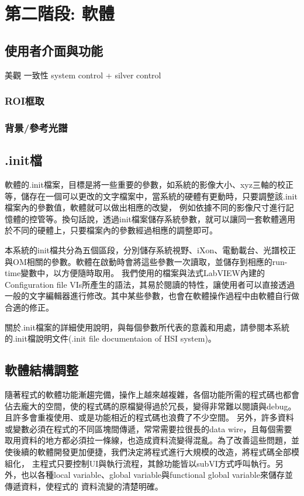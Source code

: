 \documentclass[12pt]{article}
\begin{document}
    \section{第二階段: 軟體}
    \subsection{使用者介面與功能}
    美觀 一致性 system control + silver control
    \subsubsection{ROI框取}
    \subsubsection{背景/參考光譜}
    \subsection{.init檔}
    軟體的.init檔案，目標是將一些重要的參數，如系統的影像大小、xyz三軸的校正等，儲存在一個可以更改的文字檔案中，當系統的硬體有更動時，只要調整該.init檔案內的參數值，軟體就可以做出相應的改變，
    例如依據不同的影像尺寸進行記憶體的控管等。換句話說，透過init檔案儲存系統參數，就可以讓同一套軟體適用於不同的硬體上，只要檔案內的參數經過相應的調整即可。

    本系統的init檔共分為五個區段，分別儲存系統視野、iXon、電動載台、光譜校正與OM相關的參數。軟體在啟動時會將這些參數一次讀取，並儲存到相應的run-time變數中，以方便隨時取用。
    我們使用的檔案與法式LabVIEW內建的Configuration file VIs所產生的語法，其易於閱讀的特性，讓使用者可以直接透過一般的文字編輯器進行修改。其中某些參數，也會在軟體操作過程中由軟體自行做合適的修正。

    關於.init檔案的詳細使用說明，與每個參數所代表的意義和用處，請參閱本系統的.init檔說明文件(.init file documentaion of HSI system)。
    \subsection{軟體結構調整}
    隨著程式的軟體功能漸趨完備，操作上越來越複雜，各個功能所需的程式碼也都會佔去龐大的空間，使的程式碼的原檔變得過於冗長，變得非常難以閱讀與debug。且許多會重複使用、或是功能相近的程式碼也浪費了不少空間。
    另外，許多資料或變數必須在程式的不同區塊間傳遞，常常需要拉很長的data wire，且每個需要取用資料的地方都必須拉一條線，也造成資料流變得混亂。為了改善這些問題，並使後續的軟體開發更加便捷，我們決定將程式進行大規模的改造，將程式碼全部模組化，
    主程式只要控制UI與執行流程，其餘功能皆以subVI方式呼叫執行。另外，也以各種local variable、global variable與functional global variable來儲存並傳遞資料，使程式的
    資料流變的清楚明確。
    
\end{document}
